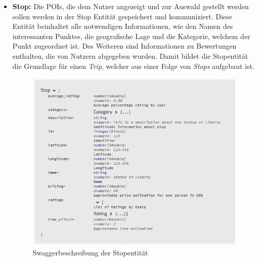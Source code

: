 	\begin{itemize}
		\item \textbf{Stop:} Die \acs{POI}s, die dem Nutzer angezeigt und zur Auswahl gestellt werden sollen werden in der Stop Entität gespeichert und kommuniziert. Diese Entität beinhaltet alle notwendigen Informationen, wie den Namen des interessanten Punktes, die geografische Lage und die Kategorie, welchem der Punkt zugeordnet ist. Des Weiteren sind Informationen zu Bewertungen enthalten, die von Nutzern abgegeben wurden. Damit bildet die Stopentität die Grundlage für einen \textit{Trip}, welcher aus einer Folge von \textit{Stops} aufgebaut ist. 
		
		\newpage
		
		\begin{figure}[ht!]
			\centering
			\includegraphics[width=1\textwidth]{images/swagger_stop_entity.png}
			\caption{Swaggerbeschreibung der Stopentität}
			\label{fig:swagger_stop}
		\end{figure} 
		

\end{itemize}
